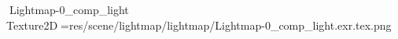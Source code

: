    Lightmap-0_comp_light            	   Texture2D   =   res/scene/lightmap/lightmap/Lightmap-0_comp_light.exr.tex.png